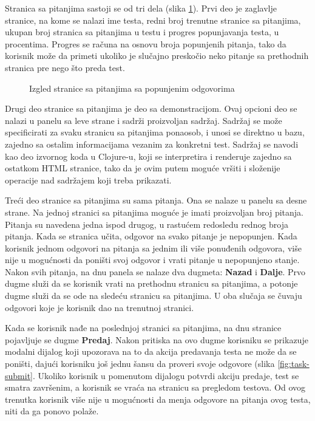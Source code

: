Stranica sa pitanjima sastoji se od tri dela (slika \ref{fig:task}). Prvi deo je zaglavlje stranice, na kome se nalazi ime testa, redni broj trenutne stranice sa pitanjima, ukupan broj stranica sa pitanjima u testu i progres popunjavanja testa, u procentima. Progres se računa na osnovu broja popunjenih pitanja, tako da korisnik može da primeti ukoliko je slučajno preskočio neko pitanje sa prethodnih stranica pre nego što preda test.
\begin{figure}[h]
\centering
{}
\caption{Izgled stranice sa pitanjima sa popunjenim odgovorima}
\label{fig:task}
\end{figure}

Drugi deo stranice sa pitanjima je deo sa demonstracijom. Ovaj opcioni deo se nalazi u panelu sa leve strane i sadrži proizvoljan sadržaj. Sadržaj se može specificirati za svaku stranicu sa pitanjima ponaosob, i unosi se direktno u bazu, zajedno sa ostalim informacijama vezanim za konkretni test. Sadržaj se navodi kao deo izvornog koda u Clojure-u, koji se interpretira i renderuje zajedno sa ostatkom HTML stranice, tako da je ovim putem moguće vršiti i složenije operacije nad sadržajem koji treba prikazati.

Treći deo stranice sa pitanjima su sama pitanja. Ona se nalaze u panelu sa desne strane. Na jednoj stranici sa pitanjima moguće je imati proizvoljan broj pitanja. Pitanja su navedena jedna ispod drugog, u rastućem redosledu rednog broja pitanja. Kada se stranica učita, odgovor na svako pitanje je nepopunjen. Kada korisnik jednom odgovori na pitanja sa jednim ili više ponuđenih odgovora, više nije u mogućnosti da poništi svoj odgovor i vrati pitanje u nepopunjeno stanje. Nakon svih pitanja, na dnu panela se nalaze dva dugmeta: \textbf{Nazad} i \textbf{Dalje}. Prvo dugme služi da se korisnik vrati na prethodnu stranicu sa pitanjima, a potonje dugme služi da se ode na sledeću stranicu sa pitanjima. U oba slučaja se čuvaju odgovori koje je korisnik dao na trenutnoj stranici.

Kada se korisnik nađe na poslednjoj stranici sa pitanjima, na dnu stranice pojavljuje se dugme \textbf{Predaj}. Nakon pritiska na ovo dugme korisniku se prikazuje modalni dijalog koji upozorava na to da akcija predavanja testa ne može da se poništi, dajući korisniku još jednu šansu da proveri svoje odgovore (slika \ref{fig:task-submit}. Ukoliko korisnik u pomenutom dijalogu potvrdi akciju predaje, test se smatra završenim, a korisnik se vraća na stranicu sa pregledom testova. Od ovog trenutka korisnik više nije u mogućnosti da menja odgovore na pitanja ovog testa, niti da ga ponovo polaže.

